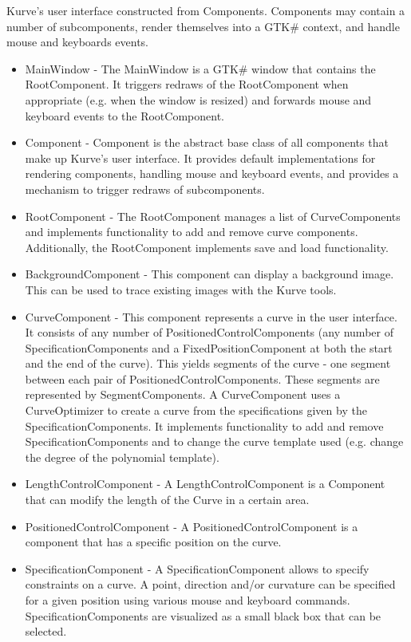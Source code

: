 \documentclass[a4paper]{article}
\begin{document}
				Kurve's user interface constructed from Components. Components may contain a number of subcomponents, render themselves into a GTK\# context, and handle mouse and keyboards events. 
				\begin{itemize} 
					\item MainWindow - The MainWindow is a GTK\# window that contains the RootComponent. It triggers redraws of the RootComponent when appropriate (e.g. when the window is resized) and forwards mouse and keyboard events to the RootComponent.
					\item Component - Component is the abstract base class of all components that make up Kurve's user interface. It provides default implementations for rendering components, handling mouse and keyboard events, and provides a mechanism to trigger redraws of subcomponents.
					\item RootComponent - The RootComponent manages a list of CurveComponents and implements functionality to add and remove curve components. Additionally, the RootComponent implements save and load functionality.
					\item BackgroundComponent - This component can display a background image. This can be used to trace existing images with the Kurve tools.
					\item CurveComponent - This component represents a curve in the user interface. It consists of any number of PositionedControlComponents (any number of SpecificationComponents and a FixedPositionComponent at both the start and the end of the curve). This yields segments of the curve - one segment between each pair of PositionedControlComponents. These segments are represented by SegmentComponents. A CurveComponent uses a CurveOptimizer to create a curve from the specifications given by the SpecificationComponents. It implements functionality to add and remove SpecificationComponents and to change the curve template used (e.g. change the degree of the polynomial template). 
					\item LengthControlComponent - A LengthControlComponent is a Component that can modify the length of the Curve in a certain area.
					\item PositionedControlComponent - A PositionedControlComponent is a component that has a specific position on the curve. 
					\item SpecificationComponent - A SpecificationComponent allows to specify constraints on a curve. A point, direction and/or curvature can be specified for a given position using various mouse and keyboard commands. SpecificationComponents are visualized as a small black box that can be selected.

\end{itemize}
\end{document}
